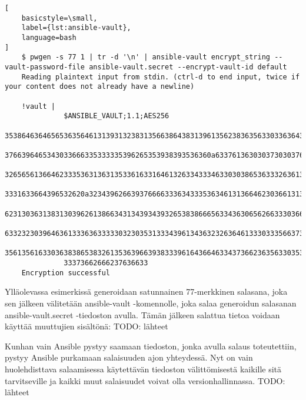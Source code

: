 \begin{lstlisting}[
    basicstyle=\small,
    label={lst:ansible-vault},
    language=bash
]
    $ pwgen -s 77 1 | tr -d '\n' | ansible-vault encrypt_string --vault-password-file ansible-vault.secret --encrypt-vault-id default
    Reading plaintext input from stdin. (ctrl-d to end input, twice if your content does not already have a newline)

    !vault |
              $ANSIBLE_VAULT;1.1;AES256
              35386463646565363564613139313238313566386438313961356238363563303363643561613032
              3766396465343033666335333335396265353938393536360a633761363030373030376139363165
              32656561366462333536313631353361633164613263343334633030386536333263613534643631
              3331633664396532620a323439626639376666333634333536346131366462303661313036393161
              62313036313831303962613866343134393439326538386665633436306562663330366535666365
              63323230396463613336363333303230353133343961343632326364613330333566373664313361
              35613561633036383865383261353639663938333961643664633437366236356330353939623039
              33373662666237636633
    Encryption successful

\end{lstlisting}

Ylläolevassa esimerkissä generoidaan satunnainen 77-merkkinen salasana, joka
sen jälkeen välitetään ansible-vault -komennolle, joka salaa generoidun
salasanan ansible-vault.secret -tiedoston avulla. Tämän jälkeen salattua tietoa
voidaan käyttää muuttujien sisältönä:
TODO: lähteet



Kunhan vain Ansible pystyy saamaan tiedoston, jonka avulla salaus toteutettiin,
pystyy Ansible purkamaan salaisuuden ajon yhteydessä. Nyt on vain huolehdisttava
salaamisessa käytettävän tiedoston välittömisestä kaikille sitä tarvitseville ja
kaikki muut salaisuudet voivat olla versionhallinnassa.
TODO: lähteet
